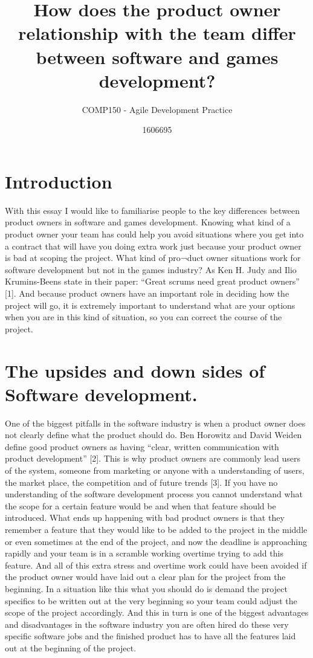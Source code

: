 \documentclass{scrartcl}
\title{How does the product owner relationship with the team differ between software and games development?}
\subtitle{COMP150 - Agile Development Practice}
\author{1606695}
\begin{document}
\maketitle


\section{Introduction}

With this essay I would like to familiarise people to the key differences between product owners in software and games development. Knowing what kind of a product owner your team has could help you avoid situations where you get into a contract that will have you doing extra work just because your product owner is bad at scoping the project. What kind of pro¬duct owner situations work for software development but not in the games industry?  
As Ken H. Judy and Ilio Krumins-Beens state in their paper: “Great scrums need great product owners” [1]. And because product owners have an important role in deciding how the project will go, it is extremely important to understand what are your options when you are in this kind of situation, so you can correct the course of the project.

\section{The upsides and down sides of Software development.}

One of the biggest pitfalls in the software industry is when a product owner does not clearly define what the product should do. Ben Horowitz and David Weiden define good product owners as having “clear, written communication with product development” [2]. This is why product owners are commonly lead users of the system, someone from marketing or anyone with a understanding of users, the market place, the competition and of future trends [3]. If you have no understanding of the software development process you cannot understand what the scope for a certain feature would be and when that feature should be introduced. What ends up happening with bad product owners is that they remember a feature that they would like to be added to the project in the middle or even sometimes at the end of the project, and now the deadline is approaching rapidly and your team is in a scramble working overtime trying to add this feature. And all of this extra stress and overtime work could have been avoided if the product owner would have laid out a clear plan for the project from the beginning. In a situation like this what you should do is demand the project specifics to be written out at the very beginning so your team could adjust the scope of the project accordingly.  
And this in turn is one of the biggest advantages and disadvantages in the software industry you are often hired do these very specific software jobs and the finished product has to have all the features laid out at the beginning of the project.
\end{document}

